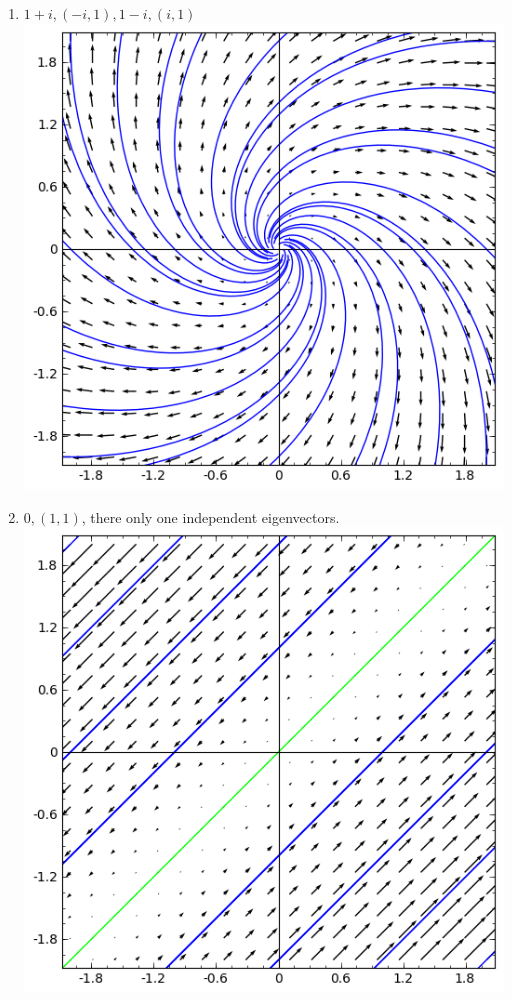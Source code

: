 {\begin{multicols}{2}
\begin{enumerate}
\begin{enumerate}
\item $1+i, (-i,1), 1-i, (i,1)$\\\includegraphics[width=\myvfwidth]{02-Applications/support/vfg}
\item $0, (1,1)$, there only one independent eigenvectors. \\\includegraphics[width=\myvfwidth]{02-Applications/support/vfh}

\end{enumerate}
\end{enumerate}
\end{multicols}}
